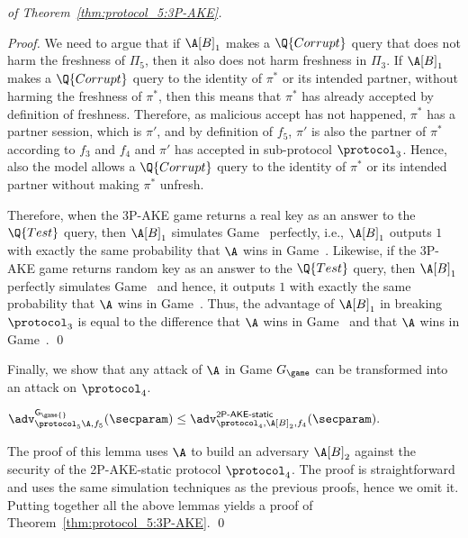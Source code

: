 \begin{proof}[of Theorem~\ref{thm:protocol_5:3P-AKE}]
\begin{proof}
\medskip
We need to argue that if $\A[B]_1$ makes a $\Q{Corrupt}$ query that does not harm the freshness of $\Pi_5$, then it also does not harm freshness in $\Pi_3$. If $\A[B]_1$ makes a $\Q{Corrupt}$ query to the identity of $\pi^*$ or its intended partner, without harming the freshness of $\pi^*$, then this means that $\pi^*$ has already accepted by definition of freshness. Therefore, as malicious accept has
not happened, $\pi^*$ has a partner session, which is $\pi'$, and by definition of $f_5$, $\pi'$ is also the partner of $\pi^*$ according
to $f_3$ and $f_4$ and $\pi'$ has accepted in sub-protocol $\protocol_3$. Hence, also the \AKEm model allows a $\Q{Corrupt}$ query to the identity of $\pi^*$ or its intended partner without making $\pi^*$ unfresh.

Therefore, when the 3P-AKE game returns a real key as an answer to the $\Q{Test}$ query, then $\A[B]_1$ simulates Game~\prevgame{} perfectly,
i.e., $\A[B]_1$ outputs $1$ with exactly the same probability that $\A$ wins in Game~\prevgame{}. Likewise, if the 3P-AKE game returns random key as an answer to the $\Q{Test}$ query, then $\A[B]_1$ perfectly simulates Game~\game{} and hence, it outputs $1$ with exactly the same probability that $\A$ wins in Game~\game{}. Thus, the advantage of $\A[B]_1$ in breaking $\protocol_3$ is equal to the difference that $\A$ wins in Game~\prevgame{} and that $\A$ wins in Game~\game{}.
\qed
\end{proof}
\item
Finally, we show that any attack of $\A$ in Game $G_\game$ can be transformed into an attack on $\protocol_4$.
\begin{lemma}\label{lemma:3P-AKE:2P-AKE-swap-random}
$
	\adv_{\protocol_5\A,f_5}^{\mathsf{G_{\game{}}}}(\secparam) 
	\leq  \adv_{\protocol_4,\A[B]_2,f_4}^{\operatorname{\mathsf{2P-AKE-static}}}(\secparam)  .
$
\end{lemma}

The proof of this lemma uses $\A$ to build an adversary $\A[B]_2$ against the security of the 2P-AKE-static protocol $\protocol_4$. 
The proof is straightforward and uses the same simulation techniques as the previous proofs,
hence we omit it. 
Putting together all the above lemmas yields a proof of Theorem~\ref{thm:protocol_5:3P-AKE}.
\qed
\end{proof} %